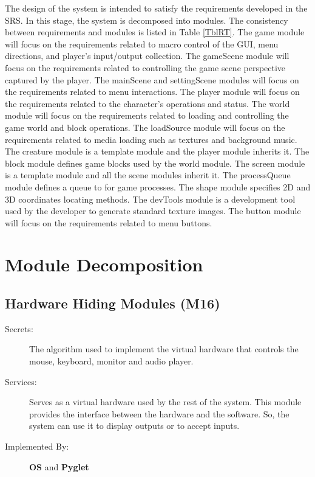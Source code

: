 \documentclass[12pt, titlepage]{article}
\begin{document}
The design of the system is intended to satisfy the requirements developed in
the SRS. In this stage, the system is decomposed into modules. The consistency
between requirements and modules is listed in Table \ref{TblRT}. The game module will focus on the requirements related to macro control of the GUI, menu directions, and player's input/output collection. The gameScene module will focus on the requirements related to controlling the game scene perspective captured by the player. The mainScene and settingScene modules will focus on the requirements related to menu interactions. The player module will focus on the requirements related to the character's operations and status. The world module will focus on the requirements related to loading and controlling the game world and block operations. The loadSource module will focus on the requirements related to media loading such as textures and background music. The creature module is a template module and the player module inherits it. The block module defines game blocks used by the world module. The screen module is a template module and all the scene modules inherit it. The processQueue module defines a queue to for game processes. The shape module specifies 2D and 3D coordinates locating methods. The devTools module is a development tool used by the developer to generate standard texture images. The button module will focus on the requirements related to menu buttons.


\section{Module Decomposition} \label{SecMD}

\subsection{Hardware Hiding Modules (M16)}

\begin{description}
\item[Secrets:]The algorithm used to implement the virtual hardware that controls the mouse, keyboard, monitor and audio player.
\item[Services:]Serves as a virtual hardware used by the rest of the
  system. This module provides the interface between the hardware and the
  software. So, the system can use it to display outputs or to accept inputs.
\item[Implemented By:] \textbf{OS} and \textbf{Pyglet}
\end{description}
\end{document}
